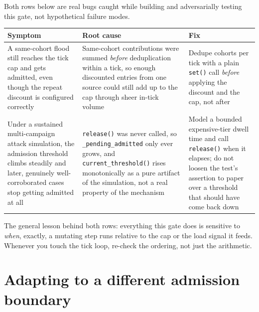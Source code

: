\documentclass[11pt]{article}
\begin{document}
Both rows below are real bugs caught while building and adversarially
testing this gate, not hypothetical failure modes.

\begin{center}\small
\begin{tabular}{>{\raggedright\arraybackslash}p{4.3cm}>{\raggedright\arraybackslash}p{4.3cm}>{\raggedright\arraybackslash}p{4.9cm}}
\toprule
Symptom & Root cause & Fix \\
\midrule
A same-cohort flood still reaches the tick cap and gets admitted, even
though the repeat discount is configured correctly &
Same-cohort contributions were summed \emph{before} deduplication within
a tick, so enough discounted entries from one source could still add up
to the cap through sheer in-tick volume &
Dedupe cohorts per tick with a plain \texttt{set()} call
\emph{before} applying the discount and the cap, not after \\
\addlinespace
Under a sustained multi-campaign attack simulation, the admission
threshold climbs steadily and later, genuinely well-corroborated cases
stop getting admitted at all &
\texttt{release()} was never called, so \texttt{\_pending\_admitted}
only ever grows, and \texttt{current\_threshold()} rises monotonically
as a pure artifact of the simulation, not a real property of the
mechanism &
Model a bounded expensive-tier dwell time and call \texttt{release()}
when it elapses; do not loosen the test's assertion to paper over a
threshold that should have come back down \\
\bottomrule
\end{tabular}
\end{center}

The general lesson behind both rows: everything this gate does is
sensitive to \emph{when}, exactly, a mutating step runs relative to the
cap or the load signal it feeds. Whenever you touch the tick loop,
re-check the ordering, not just the arithmetic.

\section{Adapting to a different admission boundary}
\label{sec:adapt}
\end{document}
